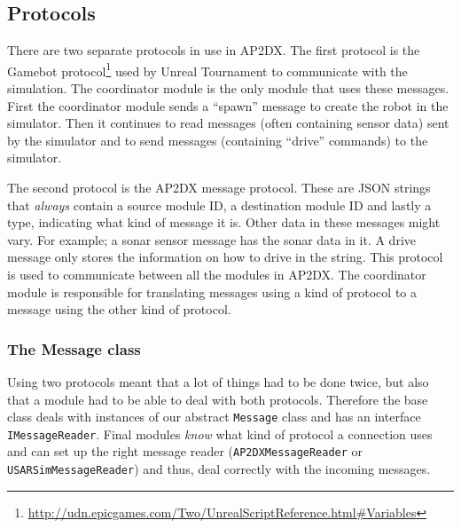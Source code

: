 \subsection{Protocols}
There are two separate protocols in use in AP2DX. The first protocol is the
Gamebot
protocol\footnote{\url{http://udn.epicgames.com/Two/UnrealScriptReference.html\#Variables}} 
used by Unreal Tournament to communicate with the simulation. The coordinator module is the 
only module that uses these messages. First the coordinator module sends a ``spawn'' message 
to create the robot in the simulator. Then it continues to read messages (often containing 
sensor data) sent by the simulator and to send messages (containing ``drive'' commands) to
the simulator. 

The second protocol is the AP2DX message protocol. These are JSON strings that \emph{always}
contain a source module ID, a destination module ID and lastly a type, indicating what kind
of message it is. Other data in these messages might vary. For example; a sonar sensor
message has the sonar data in it. A drive message only stores the information on how to drive
in the string. 
This protocol is used to communicate between all the modules in 
AP2DX.  The coordinator module is responsible for translating messages using a kind of
protocol to a message using the other kind of protocol.

\subsubsection{The Message class}
Using two protocols meant that a lot of things had to be done twice, but also that a module 
had to be able to deal with both protocols. Therefore the 
base class deals with instances
of our abstract \texttt{Message} class and has an interface \texttt{IMessageReader}. Final modules \emph{know}
what kind of protocol a connection uses and can set up the right message reader 
(\texttt{AP2DXMessageReader}
or \texttt{USARSimMessageReader}) and thus, deal correctly with the incoming messages. 

